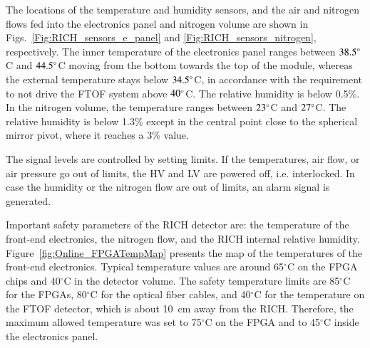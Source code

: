 \documentclass[5p,times,twocolumn]{elsarticle}
\begin{document}
The locations of the temperature and humidity sensors, and the air and nitrogen flows fed into the electronics panel and nitrogen volume are shown in Figs.~\ref{Fig:RICH_sensors_e_panel} and \ref{Fig:RICH_sensors_nitrogen},
respectively. The inner temperature of the electronics panel ranges between $\rm 38.5^\circ$C and $\rm 44.5^\circ$C
moving from the bottom towards the top of the module, whereas the external temperature stays below $\rm 34.5^\circ$C,
in accordance with the requirement to not drive the FTOF system above $\rm 40^\circ$C. The relative humidity is below
0.5\%. In the nitrogen volume, the temperature ranges between $\rm 23^\circ$C and $\rm 27^\circ$C. The relative
humidity is below 1.3\% except in the central point close to the spherical mirror pivot, where it reaches a 3\% value.

The signal levels are controlled by setting limits.  If the temperatures, air flow, or air pressure go out of limits, the
HV and LV are powered off, i.e. interlocked. In case the humidity or the nitrogen flow are out of limits, an alarm signal
is generated.

Important safety parameters of the RICH detector are: the temperature of the front-end electronics, the nitrogen
flow, and the RICH internal relative humidity. Figure~\ref{fig:Online_FPGATempMap} presents the map of the
temperatures of the front-end electronics.
Typical temperature values are around 65$^\circ$C on the FPGA chips and 40$^\circ$C in the detector volume.
The safety temperature limits are 85$^\circ$C for the FPGAs, 80$^\circ$C for the optical fiber cables, and 40$^\circ$C
for the temperature on the FTOF detector, which is about 10~cm away from the RICH. Therefore, the maximum
allowed temperature was set to 75$^\circ$C on the FPGA and to 45$^\circ$C inside the electronics panel.

\end{document}
